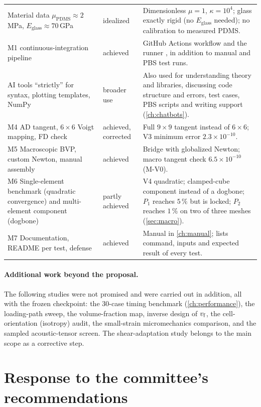 {\begin{xltabular}{\textwidth}{@{}p{3.6cm}p{2.3cm}X@{}}
Material data $\mu_\mathrm{PDMS}\approx2\,$MPa, $E_\mathrm{glass}\approx70\,$GPa & idealized &
  Dimensionless $\mu=1$, $\kappa=10^4$; glass exactly rigid (no $E_\mathrm{glass}$ needed); no calibration to measured PDMS.\\
M1 continuous-integration pipeline & achieved &
  GitHub Actions workflow and the runner , in addition to manual and PBS test runs.\\
AI tools ``strictly'' for syntax, plotting templates, NumPy & broader use &
  Also used for understanding theory and libraries, discussing code structure and
  errors, test cases, PBS scripts and writing support (\cref{ch:chatbots}).\\
M4 AD tangent, $6\times6$ Voigt mapping, FD check & achieved, corrected & Full $9\times9$ tangent instead of $6\times6$; V3 minimum error $2.3\times10^{-10}$.\\
M5 Macroscopic BVP, custom Newton, manual assembly & achieved & Bridge with globalized Newton; macro tangent check $6.5\times10^{-10}$ (M-V0).\\
M6 Single-element benchmark (quadratic convergence) and multi-element component (dogbone) &
  partly achieved & V4 quadratic; clamped-cube component instead of a dogbone; $P_1$ reaches $5\,\%$ but is locked; $P_2$ reaches $1\,\%$ on two of three meshes (\cref{sec:macro}).\\
M7 Documentation, README per test, defense & achieved & Manual in \cref{ch:manual};  lists command, inputs and expected result of every test.\\
\end{xltabular}
}

\paragraph{Additional work beyond the proposal.} The following studies were not
promised and were carried out in addition, all with the frozen checkpoint: the
30-case timing benchmark (\cref{ch:performance}), the loading-path sweep, the
volume-fraction map, inverse design of $v_{\mathrm f}$, the cell-orientation (isotropy)
audit, the small-strain micromechanics comparison, and the sampled acoustic-tensor
screen. The shear-adaptation study belongs to the main scope as a corrective step.

\section{Response to the committee's recommendations}\label{sec:committee}

